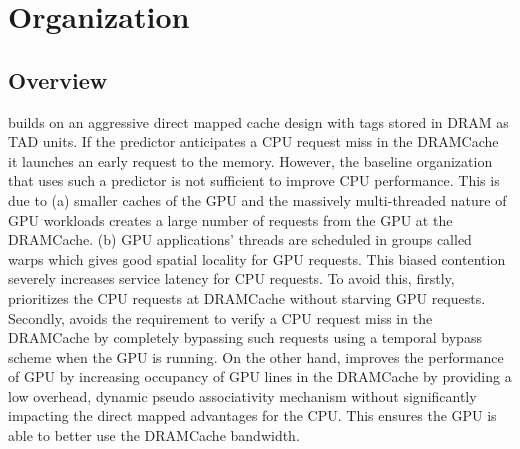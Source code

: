 \section{\cachename Organization} \label{mechanism}
\subsection{Overview}
\cachename builds on an aggressive direct mapped cache design with tags stored in DRAM as TAD units. If the predictor anticipates a CPU request miss in the DRAMCache it launches an early request to the memory. However, the baseline organization that uses such a predictor is not sufficient to improve CPU performance. This is due to (a) smaller caches of the GPU and the massively multi-threaded nature of GPU workloads creates a large number of requests from the GPU at the DRAMCache. (b) GPU applications' threads are scheduled in groups called warps which gives good spatial locality for GPU requests. This biased contention severely increases service latency for CPU requests. To avoid this, firstly, \cachename prioritizes the CPU requests at DRAMCache without starving GPU requests. Secondly, \cachename avoids the requirement to verify a  CPU request miss in the DRAMCache by completely bypassing such requests using a temporal bypass scheme when the GPU is running. On the other hand, \cachename improves the performance of GPU by increasing occupancy of GPU lines in the DRAMCache by providing a low overhead, dynamic pseudo associativity mechanism without significantly impacting the direct mapped advantages for the CPU. This ensures the GPU is able to better use the DRAMCache bandwidth.

